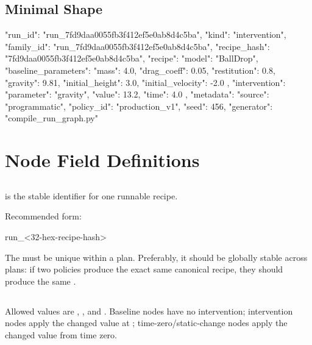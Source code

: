 \documentclass[11pt]{article}
\begin{document}
\subsection*{Minimal Shape}

\begin{DocCode}
{
  "run_id": "run_7fd9daa0055fb3f412ef5e0ab8d4c5ba",
  "kind": "intervention",
  "family_id": "run_7fd9daa0055fb3f412ef5e0ab8d4c5ba",
  "recipe_hash": "7fd9daa0055fb3f412ef5e0ab8d4c5ba",
  "recipe": {
    "model": "BallDrop",
    "baseline_parameters": {
      "mass": 4.0,
      "drag_coeff": 0.05,
      "restitution": 0.8,
      "gravity": 9.81,
      "initial_height": 3.0,
      "initial_velocity": -2.0
    },
    "intervention": {
      "parameter": "gravity",
      "value": 13.2,
      "time": 4.0
    }
  },
  "metadata": {
    "source": "programmatic",
    "policy_id": "production_v1",
    "seed": 456,
    "generator": "compile_run_graph.py"
  }
}
\end{DocCode}

\section*{Node Field Definitions}

\subsection*{\texorpdfstring{}{run\_id}}

 is the stable identifier for one runnable recipe.

Recommended form:

\begin{DocCode}
run_<32-hex-recipe-hash>
\end{DocCode}

The  must be unique within a plan.
Preferably, it should be globally stable across plans: if two policies produce the exact same canonical recipe, they should produce the same .

\subsection*{\texorpdfstring{}{kind}}

Allowed values are , , and .
Baseline nodes have no intervention; intervention nodes apply the changed value at ; time-zero/static-change nodes apply the changed value from time zero.
\end{document}
